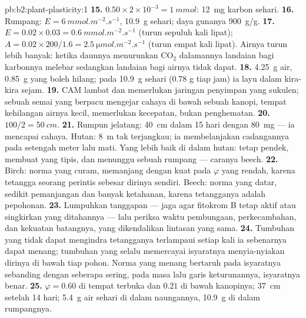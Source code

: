 \begin{solution}{pb:b2:plant-plasticity:1}
\textbf{15.} $0.50\times 2\times 10^{-3} = \qty{1}{mmol}$: \qty{12}{mg}
karbon sehari.
\textbf{16.} Rumpang: $E = \qty{6}{mmol.m^{-2}.s^{-1}}$, \qty{10.9}{g}
sehari; daya gunanya \qty{900}{g/g}.
\textbf{17.} $E = 0.02\times 0.03 = \qty{0.6}{mmol.m^{-2}.s^{-1}}$
(turun sepuluh kali lipat); $A = 0.02\times 200/1.6 = \qty{2.5}{\micro
mol.m^{-2}.s^{-1}}$ (turun empat kali lipat). Airnya turun lebih
banyak: ketika daunnya menurunkan $\mathrm{CO_2}$ dalamannya landaian
bagi karbonnya melebar sedangkan landaian bagi airnya tidak dapat.
\textbf{18.} \qty{4.25}{g} air, \qty{0.85}{g} yang boleh hilang; pada
\qty{10.9}{g} sehari ($0.78$ g tiap jam) ia layu dalam kira-kira sejam.
\textbf{19.} CAM lambat dan memerlukan jaringan penyimpan yang sukulen;
sebuah semai yang berpacu mengejar cahaya di bawah sebuah kanopi,
tempat kehilangan airnya kecil, memerlukan kecepatan, bukan penghematan.
\textbf{20.} $100/2 = \qty{50}{cm}$.
\textbf{21.} Rumpun jelatang: \qty{40}{cm} dalam 15 hari dengan
\qty{80}{mg} --- ia mencapai cahaya. Hutan: \qty{8}{m} tak terjangkau;
ia membelanjakan cadangannya pada setengah meter lalu mati. Yang lebih
baik di dalam hutan: tetap pendek, membuat  yang tipis, dan
menunggu sebuah rumpang --- caranya beech.
\textbf{22.} Birch: norma yang curam, memanjang dengan kuat pada
$\varphi$ yang rendah, karena tetangga seorang perintis sebesar dirinya
sendiri. Beech: norma yang datar, sedikit pemanjangan dan banyak
ketahanan, karena tetangganya adalah pepohonan.
\textbf{23.} Lumpuhkan tanggapan  --- jaga agar
fitokrom B tetap aktif atau singkirkan  yang
ditahannya --- lalu periksa waktu pembungaan, perkecambahan, dan
kekuatan batangnya, yang dikendalikan lintasan yang sama.
\textbf{24.} Tumbuhan yang tidak dapat mengindra tetangganya terlampaui
setiap kali ia sebenarnya dapat menang; tumbuhan yang selalu memercayai
isyaratnya menyia-nyiakan dirinya di bawah tiap pohon. Norma yang
menang bertaruh pada isyaratnya sebanding dengan seberapa sering, pada
masa lalu garis keturunannya, isyaratnya benar.
\textbf{25.} $\varphi = 0.60$ di tempat terbuka dan $0.21$ di bawah
kanopinya; \qty{37}{cm} setelah 14 hari; \qty{5.4}{g} air sehari di
dalam naungannya, \qty{10.9}{g} di dalam rumpangnya.
\end{solution}
